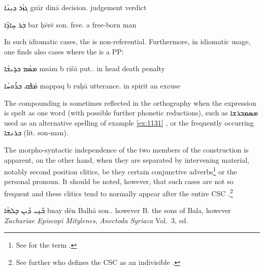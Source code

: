 {ܓܙܵܪ ܕܝܼܢܵܐ}
{gzār dinā}
{decision.\cst{} judgement}
{verdict}
{\cite[61, \S 73a]{MuraokaSyriac}}\antipar\newpage 

{ܒܲܪ ܚܹܐܖܹ̈ܐ}
{bar ḥērē}
{son.\cst{} free.\pl}
{a free-born man}
{\cite[61, \S 73b]{MuraokaSyriac}}

In such idiomatic cases, the \secn is non-referential. Furthermore, in idiomatic usage, one finds also cases where the \secn is a PP:

{ܡܣܳܡ ܒܪܻܝܫܳܐ}
{msām b\cb{} rišā}
{put.\inf.\cst{} in\cb{} head}
{death penalty}
{\cite[338, \S 357a]{DuvalSyriaque}}

{ܡܰܦ݁ܰܩ ܒܪܽܘܚܳܐ}
{mappaq b\cb{} ruḥā}
{utterance.\cst{} in\cb{} spirit}
{an excuse}
{\cite[338, \S 357a]{DuvalSyriaque}}



The compounding is sometimes reflected in the orthography when the expression is spelt as one word (with possible further phonetic reductions), such as \textsyriac{ܡܣܡܒܪܫܐ}  used as an alternative spelling of example \ref{ex:1131} \citep[285]{CSD}, or the frequently occurring \textsyriac{ܒܪܢܫܐ}  (lit. son-man).

The morpho-syntactic independence of the two members of the construction is apparent, on the other hand, when they are separated by intervening material, notably second position clitics, be they certain conjunctive adverbs\footnote{See \citet[67]{PeursenFalla} for the term .} or the  personal pronoun. It should be noted, however, that such cases are not so frequent and these clitics tend to normally appear after the entire CSC \citep[69]{PeursenFalla}.\footnote{See further \citet[183]{PeursenBenSira} who defines the CSC as an indivisible . }

{ܒ̈ܢܱܝ ܕܶܝܢ ܒܱܠܗܳܐ}
{bnay \cb{}dēn Balhā}
{son.\pl.\cst{} \cb{}however B.}
{the sons of Bala, however}
{\textit{Zachariae Episcopi Mitylenes}, \textit{Anectoda Syriaca} Vol.\ 3, ed.\ \cite[39, 16]{Land} \apud \cite[157, \S 208A]{NoldekeSyriac}}


